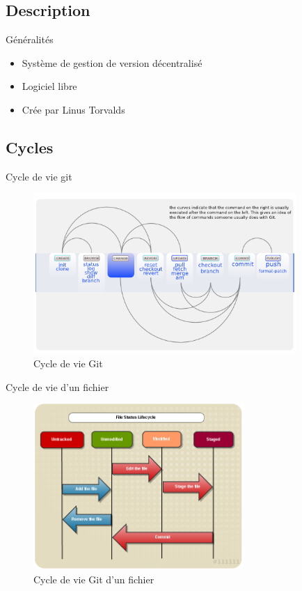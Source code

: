 \begin{frame}
	\sectionpage
\end{frame}

\subsection{Description}
	\begin{frame}{Généralités}
		\begin{itemize}[<+->]
			\item Système de gestion de version décentralisé
			\item Logiciel libre
			\item Crée par Linus Torvalds
		\end{itemize}

	\end{frame}

\subsection{Cycles}
	
	\begin{frame}{Cycle de vie git}
		\begin{figure}
			\centering
			\includegraphics[width=100mm]{./Img/GitCycle.png}
			\caption{Cycle de vie Git}
		\end{figure}

		
	\end{frame}
	
	\begin{frame}{Cycle de vie d'un fichier}
		\begin{figure}
			\centering
			\includegraphics[width=80mm]{./Img/GitLife.png}
			\caption{Cycle de vie Git d'un fichier}
		\end{figure}

	 
	\end{frame}



